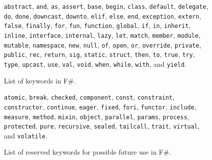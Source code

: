 \begin{figure}
  \mbox{\lstinline{abstract},} \mbox{\lstinline{and},} \mbox{\lstinline{as},} \mbox{\lstinline{assert},} \mbox{\lstinline{base},} \mbox{\lstinline{begin},} \mbox{\lstinline{class},} \mbox{\lstinline{default},} \mbox{\lstinline{delegate},} \mbox{\lstinline{do},} \mbox{\lstinline{done},} \mbox{\lstinline{downcast},} \mbox{\lstinline{downto},} \mbox{\lstinline{elif},} \mbox{\lstinline{else},} \mbox{\lstinline{end},} \mbox{\lstinline{exception},} \mbox{\lstinline{extern},} \mbox{\lstinline{false},} \mbox{\lstinline{finally},} \mbox{\lstinline{for},} \mbox{\lstinline{fun},} \mbox{\lstinline{function},} \mbox{\lstinline{global},} \mbox{\lstinline{if},} \mbox{\lstinline{in},} \mbox{\lstinline{inherit},} \mbox{\lstinline{inline},} \mbox{\lstinline{interface},} \mbox{\lstinline{internal},} \mbox{\lstinline{lazy},} \mbox{\lstinline{let},} \mbox{\lstinline{match},} \mbox{\lstinline{member},} \mbox{\lstinline{module},} \mbox{\lstinline{mutable},} \mbox{\lstinline{namespace},} \mbox{\lstinline{new},} \mbox{\lstinline{null},} \mbox{\lstinline{of},} \mbox{\lstinline{open},} \mbox{\lstinline{or},} \mbox{\lstinline{override},} \mbox{\lstinline{private},} \mbox{\lstinline{public},} \mbox{\lstinline{rec},} \mbox{\lstinline{return},} \mbox{\lstinline{sig},} \mbox{\lstinline{static},} \mbox{\lstinline{struct},} \mbox{\lstinline{then},} \mbox{\lstinline{to},} \mbox{\lstinline{true},} \mbox{\lstinline{try},} \mbox{\lstinline{type},} \mbox{\lstinline{upcast},} \mbox{\lstinline{use},} \mbox{\lstinline{val},} \mbox{\lstinline{void},} \mbox{\lstinline{when},} \mbox{\lstinline{while},} \mbox{\lstinline{with},} and \mbox{\lstinline{yield}.}
  \caption{List of keywords in F\#.}
  \label{fig:keywords}
\end{figure}
\begin{figure}
  \mbox{\lstinline{atomic},} \mbox{\lstinline{break},} \mbox{\lstinline{checked},} \mbox{\lstinline{component},} \mbox{\lstinline{const},} \mbox{\lstinline{constraint},} \mbox{\lstinline{constructor},} \mbox{\lstinline{continue},} \mbox{\lstinline{eager},} \mbox{\lstinline{fixed},} \mbox{\lstinline{fori},} \mbox{\lstinline{functor},} \mbox{\lstinline{include},} \mbox{\lstinline{measure},} \mbox{\lstinline{method},} \mbox{\lstinline{mixin},} \mbox{\lstinline{object},} \mbox{\lstinline{parallel},} \mbox{\lstinline{params},} \mbox{\lstinline{process},} \mbox{\lstinline{protected},} \mbox{\lstinline{pure},} \mbox{\lstinline{recursive},} \mbox{\lstinline{sealed},} \mbox{\lstinline{tailcall},} \mbox{\lstinline{trait},} \mbox{\lstinline{virtual},} and \mbox{\lstinline{volatile}.}
  \caption{List of reserved keywords for possible future use in F\#.}
  \label{fig:reservedKeywords}
\end{figure}
